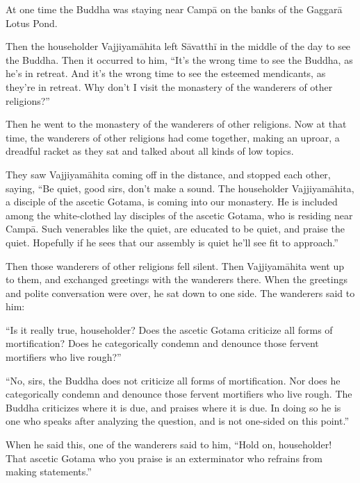 \documentclass[12pt,openany]{book}%
\begin{document}
At one time the Buddha was staying near \textsanskrit{Campā} on the banks of the \textsanskrit{Gaggarā} Lotus Pond. 

Then the householder \textsanskrit{Vajjiyamāhita} left \textsanskrit{Sāvatthī} in the middle of the day to see the Buddha. Then it occurred to him, “It’s the wrong time to see the Buddha, as he’s in retreat. And it’s the wrong time to see the esteemed mendicants, as they’re in retreat. Why don’t I visit the monastery of the wanderers of other religions?” 

Then he went to the monastery of the wanderers of other religions. Now at that time, the wanderers of other religions had come together, making an uproar, a dreadful racket as they sat and talked about all kinds of low topics. 

They saw \textsanskrit{Vajjiyamāhita} coming off in the distance, and stopped each other, saying, “Be quiet, good sirs, don’t make a sound. The householder \textsanskrit{Vajjiyamāhita}, a disciple of the ascetic Gotama, is coming into our monastery. He is included among the white-clothed lay disciples of the ascetic Gotama, who is residing near \textsanskrit{Campā}. Such venerables like the quiet, are educated to be quiet, and praise the quiet. Hopefully if he sees that our assembly is quiet he’ll see fit to approach.” 

Then those wanderers of other religions fell silent. Then \textsanskrit{Vajjiyamāhita} went up to them, and exchanged greetings with the wanderers there. When the greetings and polite conversation were over, he sat down to one side. The wanderers said to him: 

“Is it really true, householder? Does the ascetic Gotama criticize all forms of mortification? Does he categorically condemn and denounce those fervent mortifiers who live rough?” 

“No, sirs, the Buddha does not criticize all forms of mortification. Nor does he categorically condemn and denounce those fervent mortifiers who live rough. The Buddha criticizes where it is due, and praises where it is due. In doing so he is one who speaks after analyzing the question, and is not one-sided on this point.” 

When he said this, one of the wanderers said to him, “Hold on, householder! That ascetic Gotama who you praise is an exterminator who refrains from making statements.” 
\end{document}
